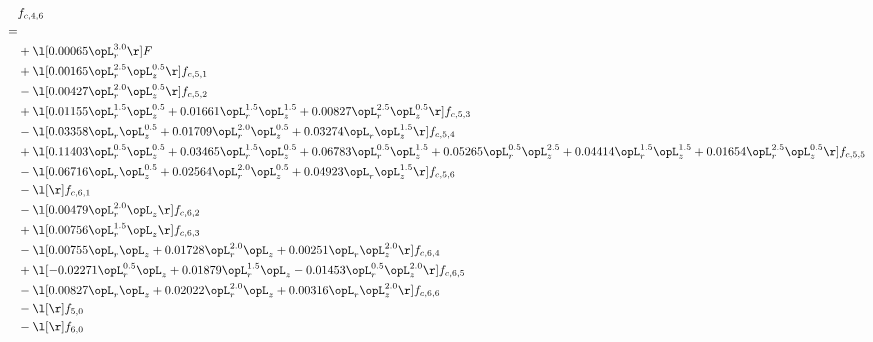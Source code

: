 \begin{alignat}{2} 
\label{eq:f_46_2} 
& f_{c,4,6} \nonumber \\ 
 = \\ 
& + \l[  0.00065 \opL_r^{3.0}  \r] F \nonumber \\ 
& + \l[  0.00165 \opL_r^{2.5} \opL_z^{0.5}  \r] f_{c,5,1} \nonumber \\ 
& - \l[  0.00427 \opL_r^{2.0} \opL_z^{0.5}  \r] f_{c,5,2} \nonumber \\ 
& + \l[  0.01155 \opL_r^{1.5} \opL_z^{0.5} +  0.01661 \opL_r^{1.5} \opL_z^{1.5} +  0.00827 \opL_r^{2.5} \opL_z^{0.5}  \r] f_{c,5,3} \nonumber \\ 
& - \l[  0.03358 \opL_r \opL_z^{0.5} +  0.01709 \opL_r^{2.0} \opL_z^{0.5} +  0.03274 \opL_r \opL_z^{1.5}  \r] f_{c,5,4} \nonumber \\ 
& + \l[  0.11403 \opL_r^{0.5} \opL_z^{0.5} +  0.03465 \opL_r^{1.5} \opL_z^{0.5} +  0.06783 \opL_r^{0.5} \opL_z^{1.5} +  0.05265 \opL_r^{0.5} \opL_z^{2.5} +  0.04414 \opL_r^{1.5} \opL_z^{1.5} +  0.01654 \opL_r^{2.5} \opL_z^{0.5}  \r] f_{c,5,5} \nonumber \\ 
& - \l[  0.06716 \opL_r \opL_z^{0.5} +  0.02564 \opL_r^{2.0} \opL_z^{0.5} +  0.04923 \opL_r \opL_z^{1.5}  \r] f_{c,5,6} \nonumber \\ 
& - \l[  \r] f_{c,6,1} \nonumber \\ 
& - \l[  0.00479 \opL_r^{2.0} \opL_z  \r] f_{c,6,2} \nonumber \\ 
& + \l[  0.00756 \opL_r^{1.5} \opL_z  \r] f_{c,6,3} \nonumber \\ 
& - \l[  0.00755 \opL_r \opL_z +  0.01728 \opL_r^{2.0} \opL_z +  0.00251 \opL_r \opL_z^{2.0}  \r] f_{c,6,4} \nonumber \\ 
& + \l[  -0.02271 \opL_r^{0.5} \opL_z +  0.01879 \opL_r^{1.5} \opL_z   -0.01453 \opL_r^{0.5} \opL_z^{2.0}  \r] f_{c,6,5} \nonumber \\ 
& - \l[  0.00827 \opL_r \opL_z +  0.02022 \opL_r^{2.0} \opL_z +  0.00316 \opL_r \opL_z^{2.0}  \r] f_{c,6,6} \nonumber \\ 
& - \l[  \r] f_{5,0} \nonumber \\ 
& - \l[  \r] f_{6,0} \nonumber \\ 
\end{alignat} 


